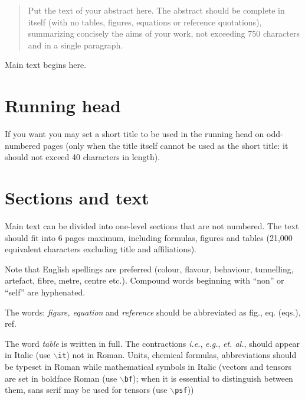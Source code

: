 %
\maketitle
%
%
%
\begin{abstract}
Put the text of your abstract here. The abstract should be complete in 
itself (with no tables, figures, equations or reference quotations),
summarizing concisely the aims of your work, not exceeding 750 characters
and in a single paragraph.
\end{abstract}
%
%
%
%
%
Main text begins here.
%
\section{Running head}
If you want you may set a short title to be used in the running
head on odd-numbered pages (only when the title itself cannot be
used as the short title: it should not exceed 40 characters in
length).   
%
\section{Sections and text}
Main text can be divided into one-level sections that are not numbered. 
The text should fit into 6 pages maximum, including formulas, figures and
tables (21,000 equivalent characters excluding title and affiliations).

Note that English spellings are preferred (colour, flavour, behaviour,
tunnelling, artefact, fibre, metre, centre etc.). Compound words 
beginning with ``non'' or ``self'' are hyphenated.

The words: {\it figure, equation\/} and {\it reference\/} should be
abbreviated as fig., eq. (eqs.), ref.

The word {\it table\/} is written in full. The contractions {\it i.e.\/}, 
{\it e.g.\/}, {\it et. al.\/}, should appear in Italic (use
$\backslash${\tt it}) not in Roman.  Units, chemical formulas,
abbreviations should be typeset in Roman while mathematical symbols in
Italic (vectors and tensors are set in boldface Roman (use
$\backslash${\tt bf}); when it is essential to distinguish between them,
sans serif may be used for tensors (use $\backslash${\tt psf}))
$$
$$

